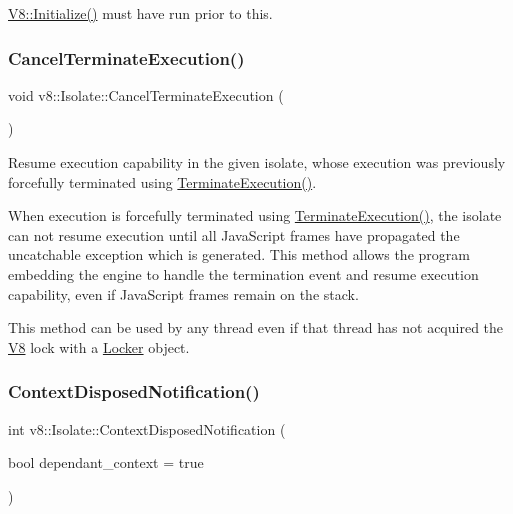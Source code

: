 \mbox{\hyperlink{classv8_1_1V8_a40daec93ce44bdd922567fc121be9db8}{V8\+::\+Initialize()}} must have run prior to this. \mbox{\label{classv8_1_1Isolate_a75cbe037e7657a7c7bd65e2edf0164d5}} 
\subsubsection{\texorpdfstring{Cancel\+Terminate\+Execution()}{CancelTerminateExecution()}}
{\footnotesize\ttfamily void v8\+::\+Isolate\+::\+Cancel\+Terminate\+Execution (\begin{DoxyParamCaption}{ }\end{DoxyParamCaption})}

Resume execution capability in the given isolate, whose execution was previously forcefully terminated using \mbox{\hyperlink{classv8_1_1Isolate_ad212b2e0b66ff5d586cd79cfa0b555fb}{Terminate\+Execution()}}.

When execution is forcefully terminated using \mbox{\hyperlink{classv8_1_1Isolate_ad212b2e0b66ff5d586cd79cfa0b555fb}{Terminate\+Execution()}}, the isolate can not resume execution until all Java\+Script frames have propagated the uncatchable exception which is generated. This method allows the program embedding the engine to handle the termination event and resume execution capability, even if Java\+Script frames remain on the stack.

This method can be used by any thread even if that thread has not acquired the \mbox{\hyperlink{classv8_1_1V8}{V8}} lock with a \mbox{\hyperlink{classv8_1_1Locker}{Locker}} object. \mbox{\label{classv8_1_1Isolate_a4b5216bbb1792211422aee575d02f442}} 
\subsubsection{\texorpdfstring{Context\+Disposed\+Notification()}{ContextDisposedNotification()}}
{\footnotesize\ttfamily int v8\+::\+Isolate\+::\+Context\+Disposed\+Notification (\begin{DoxyParamCaption}\item[{bool}]{dependant\+\_\+context = {\ttfamily true} }\end{DoxyParamCaption})}

